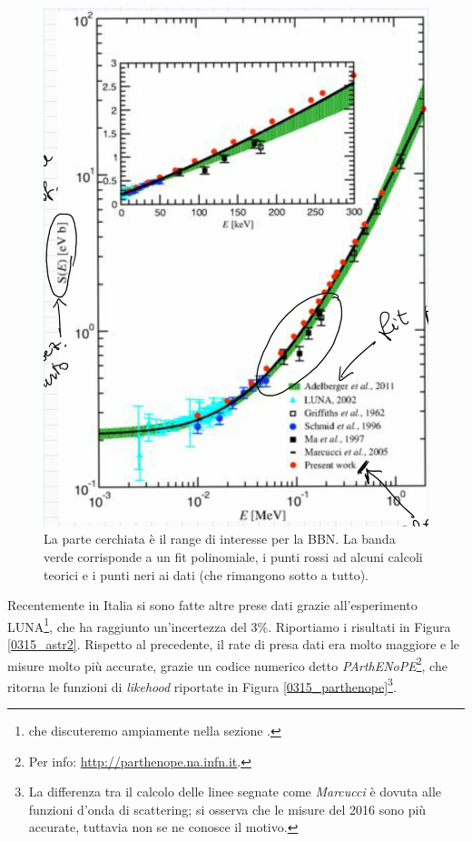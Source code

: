 \begin{figure}[h]
    \centering
    \includegraphics[scale=0.2]{Immagini/0315_fattoreastr.png}
    \caption{La parte cerchiata è il range di interesse per la BBN. La banda verde corrisponde a un fit polinomiale, i punti rossi ad alcuni calcoli teorici e i punti neri ai dati (che rimangono sotto a tutto).}
    \label{0315_astr}
\end{figure}


\noindent Recentemente in Italia si sono fatte altre prese dati grazie all'esperimento LUNA\footnote{che discuteremo ampiamente nella sezione .}, che ha raggiunto un'incertezza del 3\%. Riportiamo i risultati in Figura \ref{0315_astr2}. Rispetto al precedente, il rate di presa dati era molto maggiore e le misure molto più accurate, grazie un codice numerico detto \textit{PArthENoPE}\footnote{Per info: \url{http://parthenope.na.infn.it}.}, che ritorna le funzioni di \textit{likehood} riportate in Figura \ref{0315_parthenope}\footnote{La differenza tra il calcolo delle linee segnate come \textit{Marcucci} è dovuta alle funzioni d'onda di scattering; si osserva che le misure del 2016 sono più accurate, tuttavia non se ne conosce il motivo.}.

